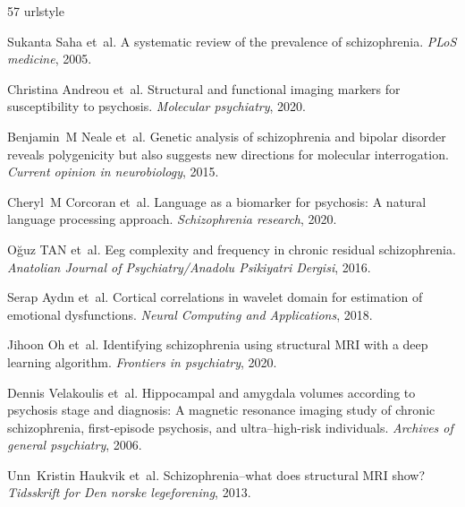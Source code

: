 \documentclass{article}
\begin{document}

%
\begin{thebibliography}{57}
\providecommand{\natexlab}[1]{#1}
\providecommand{\url}[1]{\texttt{#1}}
\expandafter\ifx\csname urlstyle\endcsname\relax
  \providecommand{\doi}[1]{doi: #1}\else
  \providecommand{\doi}{doi: \begingroup \urlstyle{rm}\Url}\fi

Sukanta Saha et~al.
\newblock A systematic review of the prevalence of schizophrenia.
\newblock \emph{PLoS medicine}, 2005.

Christina Andreou et~al.
\newblock Structural and functional imaging markers for susceptibility to psychosis.
\newblock \emph{Molecular psychiatry}, 2020.

Benjamin~M Neale et~al.
\newblock Genetic analysis of schizophrenia and bipolar disorder reveals polygenicity but also suggests new directions for molecular interrogation.
\newblock \emph{Current opinion in neurobiology}, 2015.

Cheryl~M Corcoran et~al.
\newblock Language as a biomarker for psychosis: {A} natural language processing approach.
\newblock \emph{Schizophrenia research}, 2020.

O{\u{g}}uz TAN et~al.
\newblock Eeg complexity and frequency in chronic residual schizophrenia.
\newblock \emph{Anatolian Journal of Psychiatry/Anadolu Psikiyatri Dergisi}, 2016.

Serap Ayd{\i}n et~al.
\newblock Cortical correlations in wavelet domain for estimation of emotional dysfunctions.
\newblock \emph{Neural Computing and Applications}, 2018.

Jihoon Oh et~al.
\newblock Identifying schizophrenia using structural {MRI} with a deep learning algorithm.
\newblock \emph{Frontiers in psychiatry}, 2020.

Dennis Velakoulis et~al.
\newblock Hippocampal and amygdala volumes according to psychosis stage and diagnosis: {A} magnetic resonance imaging study of chronic schizophrenia, first-episode psychosis, and ultra--high-risk individuals.
\newblock \emph{Archives of general psychiatry}, 2006.

Unn~Kristin Haukvik et~al.
\newblock Schizophrenia--what does structural {MRI} show?
\newblock \emph{Tidsskrift for Den norske legeforening}, 2013.


\end{thebibliography}
\end{document}
